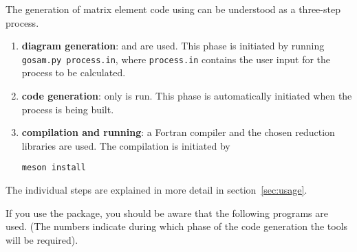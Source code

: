 The generation of matrix element code using \gosamv can be understood
as a three-step process. 
\begin{enumerate}
\item  \textbf{diagram generation}: \python
and \qgraf are used. This phase is initiated by
running \texttt{gosam.py process.in}, where \texttt{process.in} contains the 
user input for the process to be calculated.
\item \textbf{code generation}: only \form is run.
This phase is automatically initiated when the process is being built.
\item \textbf{compilation and running}: 
a Fortran compiler and the chosen reduction libraries are used.
The compilation is initiated by
\begin{lstlisting}[style=sh]
meson install
\end{lstlisting}
\end{enumerate}
The individual steps are explained in more detail in section~\ref{sec:usage}.

If you use the \gosamv package, you should be aware that
the following programs are used.
(The numbers indicate during which phase of the code generation
the tools will be required).

